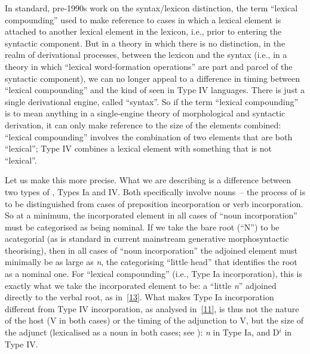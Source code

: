 \documentclass[output=paper]{langsci/langscibook}
\begin{document}
\begin{refcontext}
In standard, pre-1990s work on the syntax/lexicon distinction, the term
\enquote{lexical compounding} used to make reference to cases in which a
lexical element is attached to another lexical element in the lexicon, i.e.,
prior to entering the syntactic component. But in a theory in which there is no
distinction, in the realm of derivational processes, between the lexicon and
the syntax (i.e., in a theory in which \enquote{lexical word-formation
operations} are part and parcel of the syntactic component), we can no longer
appeal to a difference in timing between \enquote{lexical compounding} and the
kind of  seen in Type IV languages. There is just a single
derivational engine, called \enquote{syntax}. So if the term \enquote{lexical
compounding} is to mean anything in a single-engine theory of morphological and
syntactic derivation, it can only make reference to the size of the elements
combined: \enquote{lexical compounding} involves the combination of two
elements that are both \enquote{lexical}; Type IV  combines a
lexical element with something that is not \enquote{lexical}.

Let us make this more precise. What we are describing is a difference between
two types of , Types Ia and IV. Both specifically
involve nouns~-- the process of  is to be distinguished from
cases of preposition incorporation or verb incorporation. So at a minimum, the
incorporated element in all cases of \enquote{noun incorporation} must be
categorised as being nominal. If we take the bare root (\enquote{N}) to be
acategorial (as is standard in current mainstream generative morphosyntactic
theorising), then in all cases of \enquote{noun incorporation} the adjoined
element must minimally be as large as \emph{n}, the categorising
\enquote{little head} that identifies the root as a nominal one. For
\enquote{lexical compounding} (i.e., Type Ia incorporation), this is
exactly what we take the incorporated element to be: a \enquote{little
\emph{n}} adjoined directly to the verbal root, as in~\eqref{13}. What makes Type
Ia incorporation different from Type IV incorporation, as analysed
in~\eqref{11}, is thus not the nature of the host (V in both cases) or the timing
of the adjunction to V, but the size of the adjunct (lexicalised as a noun in
both cases; see ): \emph{n} in Type Ia, and D$^i$
in Type IV.


\end{refcontext}
\end{document}
